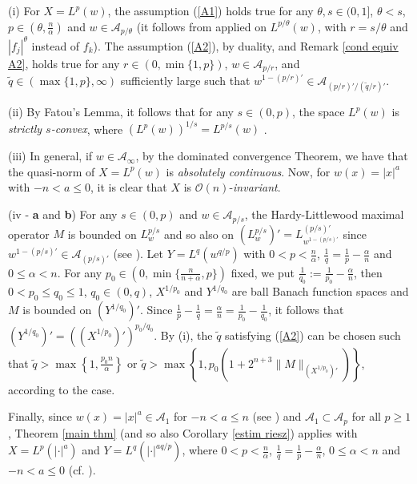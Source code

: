 \documentclass[oneside,10pt]{article}
\begin{document}
(i) For $X = L^p(w)$, the assumption (\ref{A1}) holds true for any 
$\theta, s \in (0,1]$, $\theta < s$, $p \in (\theta, \frac{n}{\alpha})$ and $w \in \mathcal{A}_{p/\theta}$ (it follows from 
\cite[Theorem 3.1 (b)]{John} applied on $L^{p/\theta}(w)$, with $r = s/\theta$ and $|f_j|^{\theta}$ instead of $f_k$). 
The assumption (\ref{A2}), by duality, \cite[Theorem 9]{Muckenh} and Remark \ref{cond equiv A2}, holds true for any 
$r \in (0, \min\{ 1, p \})$, $w \in \mathcal{A}_{p/r}$, and $\widetilde{q} \in (\max\{1, p\}, \infty)$ sufficiently large such that 
$w^{1-(p/r)'} \in \mathcal{A}_{(p/r)'/(\widetilde{q}/r)'}$.

(ii) By Fatou's Lemma, it follows that for any $s \in (0,p)$, the space $L^{p}(w)$ is \textit{strictly $s$-convex}, where 
$(L^{p}(w))^{1/s} = L^{p/s}(w)$ .

(iii) In general, if $w \in \mathcal{A}_{\infty}$, by the dominated convergence Theorem, we have that the quasi-norm of $X = L^{p}(w)$ is \textit{absolutely continuous}. Now, for $w(x) = |x|^{a}$ with $-n < a \leq 0$, it is clear that $X$ is $\mathcal{O}(n)$-\textit{invariant}. 

(iv - \textbf{a} and \textbf{b}) For any $s \in (0, p)$ and $w \in \mathcal{A}_{p/s}$, the Hardy-Littlewood maximal operator $M$ is 
bounded on $L^{p/s}_w$ and so also on $(L^{p/s}_{w})' = L^{(p/s)'}_{w^{1-(p/s)'}}$ since $w^{1-(p/s)'} \in \mathcal{A}_{(p/s)'}$ 
(see \cite[Theorem 9]{Muckenh}).  Let $Y = L^q(w^{q/p})$ with $0 <  p < \frac{n}{\alpha}$, $\frac{1}{q} = \frac{1}{p} - \frac{\alpha}{n}$ and
$0 \leq \alpha < n$. For any $p_0 \in (0, \min\{ \frac{n}{n+\alpha}, p \})$ fixed, we put $\frac{1}{q_0} := \frac{1}{p_0} - \frac{\alpha}{n}$, then $0 < p_0 \leq q_0 \leq 1$, $q_0 \in (0, q)$, $X^{1/p_0}$ and $Y^{1/q_0}$ are ball Banach function spaces and $M$ is bounded on 
$(Y^{1/q_0})'$. Since $\frac{1}{p} - \frac{1}{q} = \frac{\alpha}{n} = \frac{1}{p_0} - \frac{1}{q_0}$, it follows that 
$(Y^{1/q_0})' = ((X^{1/p_0})')^{p_0/q_0}$. By (i), the $\widetilde{q}$ satisfying (\ref{A2}) can be chosen such that 
$\widetilde{q} > \max \left\{1, \frac{p_0 n}{\alpha} \right\}$ or
$\widetilde{q} > \max \left\{1, p_0 \left(1+2^{n+3} \| M \|_{(X^{1/p_0})'} \right) \right\}$, according to the case.


Finally, since $w(x) = |x|^a \in \mathcal{A}_1$ for $-n < a \leq n$ (see \cite[Example 7.1.7]{grafakos}) and 
$\mathcal{A}_1 \subset \mathcal{A}_p$ for all $p \geq 1$, Theorem \ref{main thm} (and so also Corollary \ref{estim riesz}) applies with 
$X=L^p(|\cdot|^a)$ and $Y = L^q(|\cdot|^{aq/p})$, where $0 < p < \frac{n}{\alpha}$, $\frac{1}{q} = \frac{1}{p} - \frac{\alpha}{n}$, $0 \leq \alpha < n$ and $-n < a \leq 0$ (cf. \cite[Theorems 17 and 19]{Rocha2023}).
\end{document}
